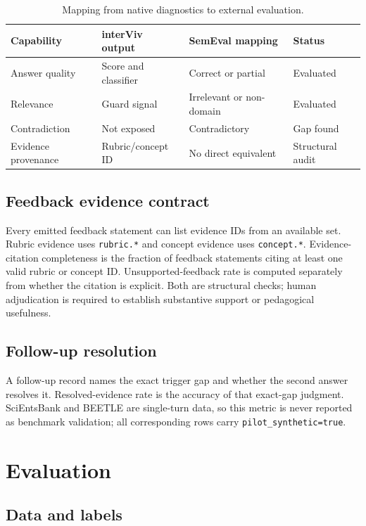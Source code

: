 \documentclass[conference,a4paper]{IEEEtran}
\begin{document}
\begin{table}[t]
\caption{Mapping from native diagnostics to external evaluation.}
\label{tab:mapping}
\centering
\scriptsize
\setlength{\tabcolsep}{3pt}
\begin{tabular}{@{}p{18mm}p{23mm}p{25mm}p{16mm}@{}}
\toprule
Capability & interViv output & SemEval mapping & Status \\
\midrule
Answer quality & Score and classifier & Correct or partial & Evaluated \\
Relevance & Guard signal & Irrelevant or non-domain & Evaluated \\
Contradiction & Not exposed & Contradictory & Gap found \\
Evidence provenance & Rubric/concept ID & No direct equivalent & Structural audit \\
\bottomrule
\end{tabular}
\end{table}

\subsection{Feedback evidence contract}

Every emitted feedback statement can list evidence IDs from an available set.
Rubric evidence uses \texttt{rubric.*} and concept evidence uses
\texttt{concept.*}. Evidence-citation completeness is the fraction of feedback
statements citing at least one valid rubric or concept ID. Unsupported-feedback
rate is computed separately from whether the citation is explicit. Both are
structural checks; human adjudication is required to establish substantive
support or pedagogical usefulness.

\subsection{Follow-up resolution}

A follow-up record names the exact trigger gap and whether the second answer
resolves it. Resolved-evidence rate is the accuracy of that exact-gap judgment.
SciEntsBank and BEETLE are single-turn data, so this metric is never reported as
benchmark validation; all corresponding rows carry
\texttt{pilot\_synthetic=true}.

\section{Evaluation}

\subsection{Data and labels}
\end{document}
